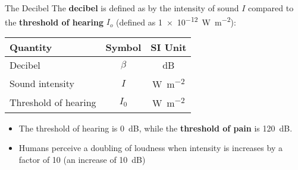 \documentclass[12pt,aspectratio=169]{beamer}
\newcommand{\pic}[2]{\texttt{[image: \#2]}}
\newcommand{\eq}[2]{\vspace{#1}{\Large\begin{displaymath}#2\end{displaymath}}}
\begin{document}
%
%
%
%
%
%



\begin{frame}{The Decibel}
  The \textbf{decibel} is defined as by the intensity of sound $I$ compared to
  the \textbf{threshold of hearing} $I_o$ (defined as
  \SI{1e-12}{\watt\per\metre^2}):
  
  \eq{-.2in}{
    \boxed{\beta=10\log_{10}\left[\frac{I}{I_0}\right]}
  }
  \begin{center}
    \begin{tabular}{l|c|c}
      \rowcolor{pink}
      \textbf{Quantity} & \textbf{Symbol} & \textbf{SI Unit} \\ \hline
      Decibel              & $\beta$ & \si{dB}\\
      Sound intensity      & $I$     & \si{\watt\per\metre^2}\\
      Threshold of hearing & $I_0$   &  \si{\watt\per\metre^2}
    \end{tabular}
  \end{center}  
  
  \begin{itemize}
  \item The threshold of hearing is \SI{0}{dB}, while the
    \textbf{threshold of pain} is \SI{120}{dB}.
  \item Humans perceive a doubling of loudness when intensity is increases by a
    factor of \num{10} (an increase of \SI{10}{dB})
  \end{itemize}
\end{frame}
\end{document}
